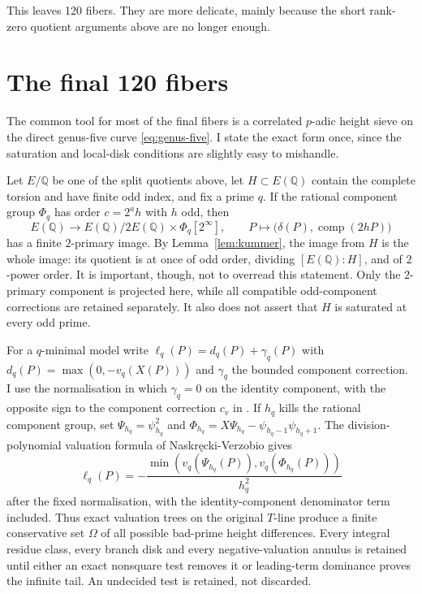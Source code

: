 \documentclass[11pt,a4paper]{amsart}
\newcommand{\Q}{\mathbb Q}
\begin{document}
This leaves 120 fibers. They are more delicate, mainly because the short rank-zero quotient arguments above are no longer enough.

\section{The final 120 fibers}
The common tool for most of the final fibers is a correlated $p$-adic height sieve on the direct genus-five curve \eqref{eq:genus-five}. I state the exact form once, since the saturation and local-disk conditions are slightly easy to mishandle.

Let $E/\Q$ be one of the split quotients above, let $H\subset E(\Q)$ contain the complete torsion and have finite odd index, and fix a prime $q$. If the rational component group $\Phi_q$ has order $c=2^ah$ with $h$ odd, then
\setcounter{equation}{7}
\begin{equation}\label{eq:component-map}
E(\Q)\longrightarrow E(\Q)/2E(\Q)\times\Phi_q[2^\infty],
\qquad P\longmapsto\bigl(\delta(P),\operatorname{comp}(2hP)\bigr)
\end{equation}
has a finite $2$-primary image. By Lemma~\ref{lem:kummer}, the image from $H$ is the whole image: its quotient is at once of odd order, dividing $[E(\Q):H]$, and of $2$-power order. It is important, though, not to overread this statement. Only the $2$-primary component is projected here, while all compatible odd-component corrections are retained separately. It also does not assert that $H$ is saturated at every odd prime.

For a $q$-minimal model write $\ell_q(P)=d_q(P)+\gamma_q(P)$ with $d_q(P)=\max(0,-v_q(X(P)))$ and $\gamma_q$ the bounded component correction. I use the normalisation in which $\gamma_q=0$ on the identity component, with the opposite sign to the component correction $c_v$ in \cite{NV}. If $h_q$ kills the rational component group, set $\Psi_{h_q}=\psi_{h_q}^2$ and $\Phi_{h_q}=X\Psi_{h_q}-\psi_{h_q-1}\psi_{h_q+1}$. The division-polynomial valuation formula of Naskr\k{e}cki-Verzobio \cite{NV} gives
\[
\ell_q(P)=-\frac{\min(v_q(\Psi_{h_q}(P)),v_q(\Phi_{h_q}(P)))}{h_q^2}
\]
after the fixed normalisation, with the identity-component denominator term included. Thus exact valuation trees on the original $T$-line produce a finite conservative set $\Omega$ of all possible bad-prime height differences. Every integral residue class, every branch disk and every negative-valuation annulus is retained until either an exact nonsquare test removes it or leading-term dominance proves the infinite tail. An undecided test is retained, not discarded.
\end{document}
